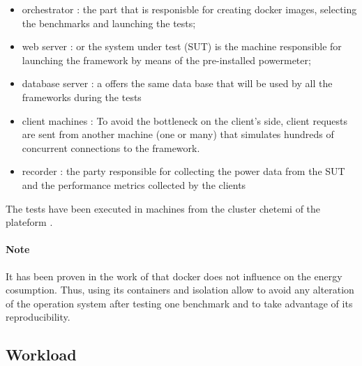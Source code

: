 \begin{itemize}
    \item orchestrator : the part that is responisble for creating docker images, selecting the benchmarks and launching the tests;
    \item web server : or the system under test (SUT) is the machine  responsible for launching the framework  by means of the pre-installed powermeter;
    \item database server : a offers the same data base that will be used by all the frameworks during the tests
    \item client machines : To avoid the bottleneck on the client's side, client requests are sent from another machine (one or many) that simulates hundreds of concurrent connections to the framework.
    \item recorder : the party responsible for collecting the power data from the SUT and the performance metrics collected by the clients 
\end{itemize}

The tests have been executed in machines from the cluster chetemi of the  plateform .

\paragraph{Note}
It has been proven in the work of \citeauthor{eddie_antonio_santos_how} that docker does not influence on the energy cosumption\cite{eddie_antonio_santos_how}. Thus, using its containers and isolation allow to avoid any alteration of the operation system after testing one benchmark and to take advantage of its reproducibility.

\subsection{Workload}

